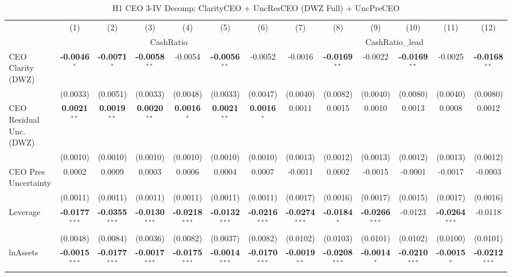 \begin{landscape}
\begin{table}[H]
\setlength{\tabcolsep}{3pt}
\renewcommand{\arraystretch}{0.85}
\centering
\caption{H1 CEO 3-IV Decomp: ClarityCEO + UncResCEO (DWZ Full) + UncPreCEO}
\label{tab:h1_ceo2_decomp}
\scriptsize
\begin{tabular}{lcccccccccccc}
\toprule
 & (1) & (2) & (3) & (4) & (5) & (6) & (7) & (8) & (9) & (10) & (11) & (12) \\
 & \multicolumn{6}{c}{CashRatio} & \multicolumn{6}{c}{CashRatio\_lead} \\
\cmidrule(lr){2-7} \cmidrule(lr){8-13}
\midrule
CEO Clarity (DWZ) & \textbf{-0.0046}$^{*}$ & \textbf{-0.0071}$^{*}$ & \textbf{-0.0058}$^{**}$ & -0.0054 & \textbf{-0.0056}$^{**}$ & -0.0052 & -0.0016 & \textbf{-0.0169}$^{**}$ & -0.0022 & \textbf{-0.0169}$^{**}$ & -0.0025 & \textbf{-0.0168}$^{**}$ \\
 & (0.0033) & (0.0051) & (0.0033) & (0.0048) & (0.0033) & (0.0047) & (0.0040) & (0.0082) & (0.0040) & (0.0080) & (0.0040) & (0.0080) \\
CEO Residual Unc. (DWZ) & \textbf{0.0021}$^{**}$ & \textbf{0.0019}$^{**}$ & \textbf{0.0020}$^{**}$ & \textbf{0.0016}$^{*}$ & \textbf{0.0021}$^{**}$ & \textbf{0.0016}$^{*}$ & 0.0011 & 0.0015 & 0.0010 & 0.0013 & 0.0008 & 0.0012 \\
 & (0.0010) & (0.0010) & (0.0010) & (0.0010) & (0.0010) & (0.0010) & (0.0013) & (0.0012) & (0.0013) & (0.0012) & (0.0013) & (0.0012) \\
CEO Pres Uncertainty & 0.0002 & 0.0009 & 0.0003 & 0.0006 & 0.0004 & 0.0007 & -0.0011 & 0.0002 & -0.0015 & -0.0001 & -0.0017 & -0.0003 \\
 & (0.0011) & (0.0011) & (0.0011) & (0.0011) & (0.0011) & (0.0011) & (0.0017) & (0.0016) & (0.0017) & (0.0015) & (0.0017) & (0.0016) \\
\midrule
Leverage & \textbf{-0.0177}$^{***}$ & \textbf{-0.0355}$^{***}$ & \textbf{-0.0130}$^{***}$ & \textbf{-0.0218}$^{***}$ & \textbf{-0.0132}$^{***}$ & \textbf{-0.0216}$^{***}$ & \textbf{-0.0274}$^{***}$ & \textbf{-0.0184}$^{*}$ & \textbf{-0.0266}$^{***}$ & -0.0123 & \textbf{-0.0264}$^{***}$ & -0.0118 \\
 & (0.0048) & (0.0084) & (0.0036) & (0.0082) & (0.0037) & (0.0082) & (0.0102) & (0.0103) & (0.0101) & (0.0102) & (0.0100) & (0.0101) \\
lnAssets & \textbf{-0.0015}$^{***}$ & \textbf{-0.0177}$^{***}$ & \textbf{-0.0017}$^{***}$ & \textbf{-0.0175}$^{***}$ & \textbf{-0.0014}$^{***}$ & \textbf{-0.0170}$^{***}$ & \textbf{-0.0019}$^{**}$ & \textbf{-0.0208}$^{***}$ & \textbf{-0.0014}$^{*}$ & \textbf{-0.0210}$^{***}$ & \textbf{-0.0015}$^{*}$ & \textbf{-0.0212}$^{***}$ \\

\end{tabular}
\end{table}
\end{landscape}

